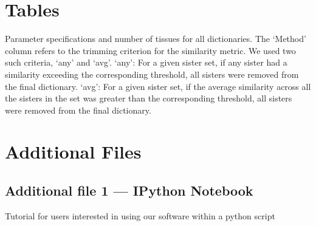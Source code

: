 \documentclass{bmcart}
\begin{document}
\begin{backmatter}

\section*{Tables}
\begin{table}[h!]
\caption{Parameter specifications and number of tissues for all dictionaries.
The `Method' column refers to the trimming criterion for the similarity metric. We 
used two such criteria, `any' and `avg'.
`any': For a given sister set, if any sister had a similarity exceeding the corresponding
threshold, all sisters were removed from the final dictionary.
`avg': For a given sister set, if the average similarity across all the sisters in the set
was greater than the corresponding threshold, all sisters were removed from the final dictionary.}
	\label{tab:DictionarySpecs}
\end{table}


\section*{Additional Files}
  \subsection*{Additional file 1 --- IPython Notebook}
    Tutorial for users interested in using our software within a python script


\end{backmatter}
\end{document}
